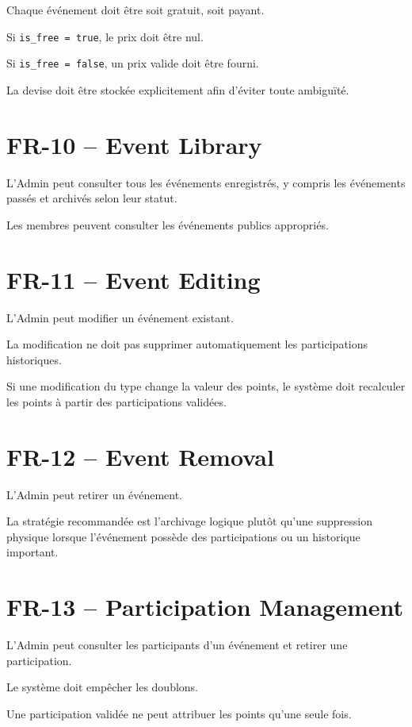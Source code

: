 \documentclass[11pt,a4paper]{report}
\begin{document}
Chaque événement doit être soit gratuit, soit payant.

Si \texttt{is\_free = true}, le prix doit être nul.

Si \texttt{is\_free = false}, un prix valide doit être fourni.

La devise doit être stockée explicitement afin d'éviter toute ambiguïté.

\section{FR-10 -- Event Library}

L'Admin peut consulter tous les événements enregistrés, y compris les événements passés et archivés selon leur statut.

Les membres peuvent consulter les événements publics appropriés.

\section{FR-11 -- Event Editing}

L'Admin peut modifier un événement existant.

La modification ne doit pas supprimer automatiquement les participations historiques.

Si une modification du type change la valeur des points, le système doit recalculer les points à partir des participations validées.

\section{FR-12 -- Event Removal}

L'Admin peut retirer un événement.

La stratégie recommandée est l'archivage logique plutôt qu'une suppression physique lorsque l'événement possède des participations ou un historique important.

\section{FR-13 -- Participation Management}

L'Admin peut consulter les participants d'un événement et retirer une participation.

Le système doit empêcher les doublons.

Une participation validée ne peut attribuer les points qu'une seule fois.
\end{document}
